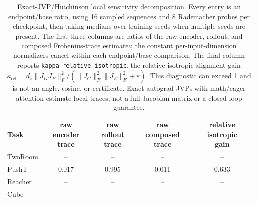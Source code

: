 \begin{table}[H]
\centering
\caption{Exact-JVP/Hutchinson local sensitivity decomposition. Every entry is an endpoint/base ratio, using 16 sampled sequences and 8 Rademacher probes per checkpoint, then taking medians over training seeds when multiple seeds are present. The first three columns are ratios of the raw encoder, rollout, and composed Frobenius-trace estimates; the constant per-input-dimension normalizers cancel within each endpoint/base comparison. The final column reports \texttt{kappa\_relative\_isotropic}, the relative isotropic alignment gain $\kappa_{\mathrm{rel}}=d_z\lVert J_GJ_E\rVert_F^2/(\lVert J_G\rVert_F^2\lVert J_E\rVert_F^2+\varepsilon)$. This diagnostic can exceed 1 and is not an angle, cosine, or certificate. Exact autograd JVPs with math/eager attention estimate local traces, not a full Jacobian matrix or a closed-loop guarantee.}
\label{tab:jvp-hutchinson-sensitivity-audit}
\small
\setlength{\tabcolsep}{3.5pt}
\begin{tabular}{lcccc}
\toprule
Task & \shortstack{raw encoder\\trace} & \shortstack{raw rollout\\trace} & \shortstack{raw composed\\trace} & \shortstack{relative isotropic\\gain} \\
\midrule
TwoRoom & -- & -- & -- & -- \\
PushT & 0.017 & 0.995 & 0.011 & 0.633 \\
Reacher & -- & -- & -- & -- \\
Cube & -- & -- & -- & -- \\
\bottomrule
\end{tabular}
\end{table}

